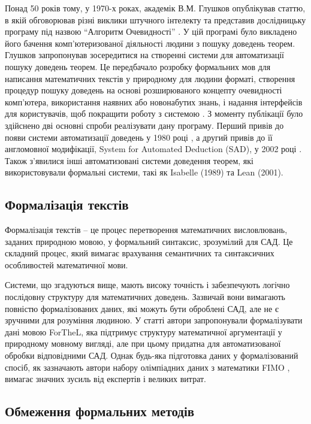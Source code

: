 Понад 50 років тому, у 1970-х роках, академік В.М. Глушков опублікував статтю, в якій обговорював різні виклики штучного інтелекту та представив дослідницьку програму під назвою ``Алгоритм Очевидності'' \cite{glushkov1970some}. У цій програмі було викладено його бачення комп'ютеризованої діяльності людини з пошуку доведень теорем. Глушков запропонував зосередитися на створенні системи для автоматизації пошуку доведень теорем. Це передбачало розробку формальних мов для написання математичних текстів у природному для людини форматі, створення процедур пошуку доведень на основі розширюваного концепту очевидності комп'ютера, використання наявних або новонабутих знань, і надання інтерфейсів для користувачів, щоб покращити роботу з системою \cite{Glushkov1970, Glushkov1972}. З моменту публікації було здійснено дві основні спроби реалізувати дану програму. Перший привів до появи системи автоматизації доведень у 1980 році \cite{glushovsad1980}, а другий привів до її англомовної модифікації, System for Automated Deduction (SAD), у 2002 році \cite{10.1007/978-3-540-73595-3_29}. Також з'явилися  інші автоматизовані системи доведення теорем, які використовували формальні системи, такі як Isabelle \cite{paulson1986natural} (1989) та Lean \cite{demoura2015lean} (2001).

\subsection{Формалізація текстів}

Формалізація текстів -- це процес перетворення математичних висловлювань, заданих природною мовою, у формальний синтаксис, зрозумілий для САД. Це складний процес, який вимагає врахування семантичних та синтаксичних особливостей математичної мови.

Системи, що згадуються вище, мають високу точність і забезпечують логічно послідовну структуру для математичних доведень. Зазвичай вони вимагають повністю формалізованих даних, які можуть бути оброблені САД, але не є зручними для розуміння людиною. У статті \cite{10.1007/978-3-540-85110-3_47} автори запропонували формалізувати дані мовою ForTheL, яка підтримує структуру математичної аргументації у природному мовному вигляді, але при цьому придатна для автоматизованої обробки відповідними САД. Однак будь-яка підготовка даних у формалізований спосіб, як зазначають автори набору олімпіадних даних з математики FIMO \cite{liu2023fimochallengeformaldataset}, вимагає значних зусиль від експертів і великих витрат.

\subsection{Обмеження формальних методів}

